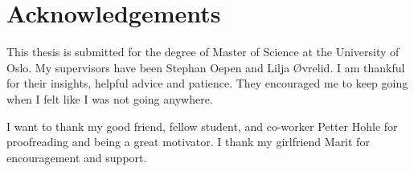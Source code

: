 \chapter*{Acknowledgements}
\thispagestyle{empty}

This thesis is submitted for the degree of Master of Science at the University of Oslo. My supervisors have been Stephan Oepen and Lilja Øvrelid. I am thankful for their insights, helpful advice and patience. They encouraged me to keep going when I felt like I was not going anywhere.

I want to thank my good friend, fellow student, and co-worker Petter Hohle for proofreading and being a great motivator. I thank my girlfriend Marit for encouragement and support.